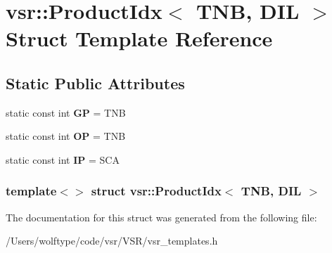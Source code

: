 \hypertarget{structvsr_1_1_product_idx_3_01_t_n_b_00_01_d_i_l_01_4}{\section{vsr\-:\-:Product\-Idx$<$ T\-N\-B, D\-I\-L $>$ Struct Template Reference}
\label{structvsr_1_1_product_idx_3_01_t_n_b_00_01_d_i_l_01_4}
}
\subsection*{Static Public Attributes}
\begin{DoxyCompactItemize}
\item 
\hypertarget{structvsr_1_1_product_idx_3_01_t_n_b_00_01_d_i_l_01_4_aec500a43132518f26fcd8ea23d8b78d0}{static const int {\bfseries G\-P} = T\-N\-B}\label{structvsr_1_1_product_idx_3_01_t_n_b_00_01_d_i_l_01_4_aec500a43132518f26fcd8ea23d8b78d0}

\item 
\hypertarget{structvsr_1_1_product_idx_3_01_t_n_b_00_01_d_i_l_01_4_a794b0594e7644aa8976cbfcb176146b7}{static const int {\bfseries O\-P} = T\-N\-B}\label{structvsr_1_1_product_idx_3_01_t_n_b_00_01_d_i_l_01_4_a794b0594e7644aa8976cbfcb176146b7}

\item 
\hypertarget{structvsr_1_1_product_idx_3_01_t_n_b_00_01_d_i_l_01_4_a08967b7383d0e5e4dc1bc112ac277813}{static const int {\bfseries I\-P} = S\-C\-A}\label{structvsr_1_1_product_idx_3_01_t_n_b_00_01_d_i_l_01_4_a08967b7383d0e5e4dc1bc112ac277813}

\end{DoxyCompactItemize}
\subsubsection*{template$<$$>$ struct vsr\-::\-Product\-Idx$<$ T\-N\-B, D\-I\-L $>$}



The documentation for this struct was generated from the following file\-:\begin{DoxyCompactItemize}
\item 
/\-Users/wolftype/code/vsr/\-V\-S\-R/vsr\-\_\-templates.\-h\end{DoxyCompactItemize}
